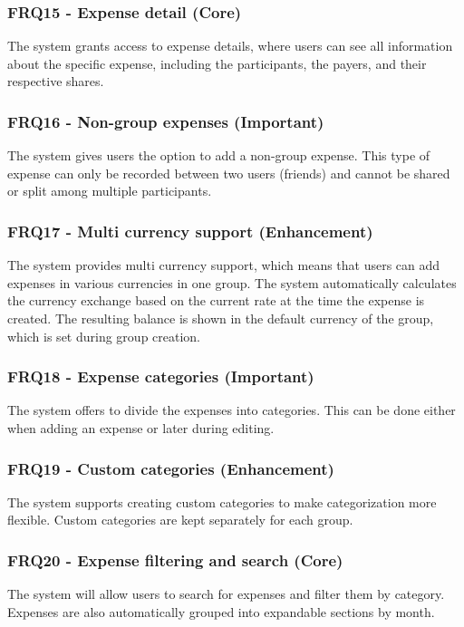\documentclass{ctuthesis}
\begin{document}
\subsubsection{FRQ15 - Expense detail (Core)}
The system grants access to expense details, where users can see all information about the specific expense, including the participants, the payers, and their respective shares.

\subsubsection{\label{frq:16}FRQ16 - Non-group expenses (Important)}
The system gives users the option to add a non-group expense. This type of expense can only be recorded between two users (friends) and cannot be shared or split among multiple participants.

\subsubsection{FRQ17 - Multi currency support (Enhancement)}
The system provides multi currency support, which means that users can add expenses in various currencies in one group. The system automatically calculates the currency exchange based on the current rate at the time the expense is created. The resulting balance is shown in the default currency of the group, which is set during group creation.

\subsubsection{FRQ18 - Expense categories (Important)}
The system offers to divide the expenses into categories. This can be done either when adding an expense or later during editing.

\subsubsection{FRQ19 - Custom categories (Enhancement)}
The system supports creating custom categories to make categorization more flexible. Custom categories are kept separately for each group.

\subsubsection{FRQ20 - Expense filtering and search (Core)}
The system will allow users to search for expenses and filter them by category. Expenses are also automatically grouped into expandable sections by month.
\end{document}

